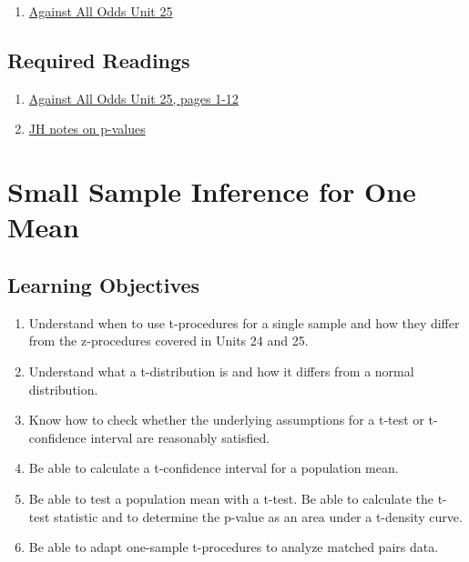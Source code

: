 \documentclass[letterpaper,10pt,twocolumn,twoside,printwatermark=false]{pinp}
\providecommand{\tightlist}{%
  \setlength{\itemsep}{0pt}\setlength{\parskip}{0pt}}
\begin{document}
\begin{enumerate}
\def\labelenumi{\arabic{enumi}.}
\tightlist
\item
  \href{https://www.learner.org/courses/againstallodds/unitpages/unit25.html}{Against
  All Odds Unit 25}
\end{enumerate}

\hypertarget{required-readings-1}{%
\subsection{Required Readings}\label{required-readings-1}}

\begin{enumerate}
\item \href{https://www.learner.org/courses/againstallodds/pdfs/AgainstAllOdds_StudentGuide_Unit25.pdf#page=1}{Against All Odds Unit 25, pages 1-12}
\item \href{http://www.medicine.mcgill.ca/epidemiology/hanley/BionanoWorkshop/P-Values.pdf}{JH notes on p-values}
\end{enumerate}

\hypertarget{small-sample-inference-for-one-mean}{%
\section{Small Sample Inference for One
Mean}\label{small-sample-inference-for-one-mean}}

\hypertarget{learning-objectives-2}{%
\subsection{Learning Objectives}\label{learning-objectives-2}}

\begin{enumerate}
\def\labelenumi{\arabic{enumi}.}
\tightlist
\item
  Understand when to use t-procedures for a single sample and how they
  differ from the z-procedures covered in Units 24 and 25.
\item
  Understand what a t-distribution is and how it differs from a normal
  distribution.
\item
  Know how to check whether the underlying assumptions for a t-test or
  t-confidence interval are reasonably satisfied.
\item
  Be able to calculate a t-confidence interval for a population mean.
\item
  Be able to test a population mean with a t-test. Be able to calculate
  the t-test statistic and to determine the p-value as an area under a
  t-density curve.
\item
  Be able to adapt one-sample t-procedures to analyze matched pairs
  data.
\end{enumerate}
\end{document}

